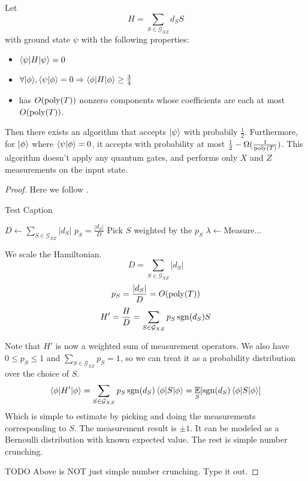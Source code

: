 \begin{theorem}
	Let $$H=\sum_{S\in\mathcal{G}_{XZ}} d_S S$$
	with ground state $\psi$ with the following properties:
	\begin{itemize}
		\item $\braket{\psi|H|\psi}=0$
		\item $\forall{\ket\phi}, \braket{\psi|\phi}=0\Rightarrow\braket{\phi|H|\phi}\geq\frac{3}{4}$
		\item has $O(\operatorname*{\operatorname{poly}}(T))$ nonzero components whose coefficients are each at most $O(\operatorname*{\operatorname{poly}}(T))$.
	\end{itemize}
	Then there exists an algorithm that accepts $\ket\psi$ with probabily $\frac{1}{2}$. Furthermore, for $\ket\phi$ where $\braket{\psi|\phi}=0$, it accepts with probability at most $\frac{1}{2}-\Omega(\frac{1}{\operatorname*{\operatorname{poly}}(T)})$. This algorithm doesn't apply any quantum gates, and performs only $X$ and $Z$ measurements on the input state.
\end{theorem}
\begin{proof}

Here we follow \cite{PhysRevA.93.022326}.

	\begin{algorithm}
		\caption{Test Caption}
		\begin{algorithmic}[1]
			\State $D\gets\sum_{S\in\mathcal{G}_{XZ}}|d_S|$
			\State $p_S=\frac{|d_S|}{D}$
			\State Pick $S$ weighted by the $p_S$
			\State $\lambda\gets$Measure...
		\end{algorithmic}
	\end{algorithm}

We scale the Hamiltonian.
$$D=\sum_{S\in\mathcal{G}_{XZ}}|d_S|$$
$$p_S=\frac{|d_S|}{D}=O(\operatorname*{\operatorname{poly}}(T))$$
$$H'=\frac{H}{D}=\sum_{S\in\mathcal{G}_{XZ}} p_S\operatorname{sgn}(d_S)S$$

Note that $H'$ is now a weighted sum of measurement operators. We also have $0\leq p_S\leq1$ and $\sum_{S\in\mathcal{G}_{XZ}} p_S=1$, so we can treat it as a probability distribution over the choice of $S$.
$$\braket{\phi|H'|\phi}=\sum_{S\in\mathcal{G}_{XZ}} p_S\operatorname{sgn}(d_S)\braket{\phi|S|\phi}=\operatorname*{\mathbb{E}}_S[\operatorname{sgn}(d_S)\braket{\phi|S|\phi}]$$
Which is simple to estimate by picking and doing the measurements corresponding to $S$. The measurement result is $\pm1$. It can be modeled as a Bernoulli distribution with known expected value. The rest is simple number crunching.

TODO Above is NOT just simple number crunching. Type it out.
\end{proof}

